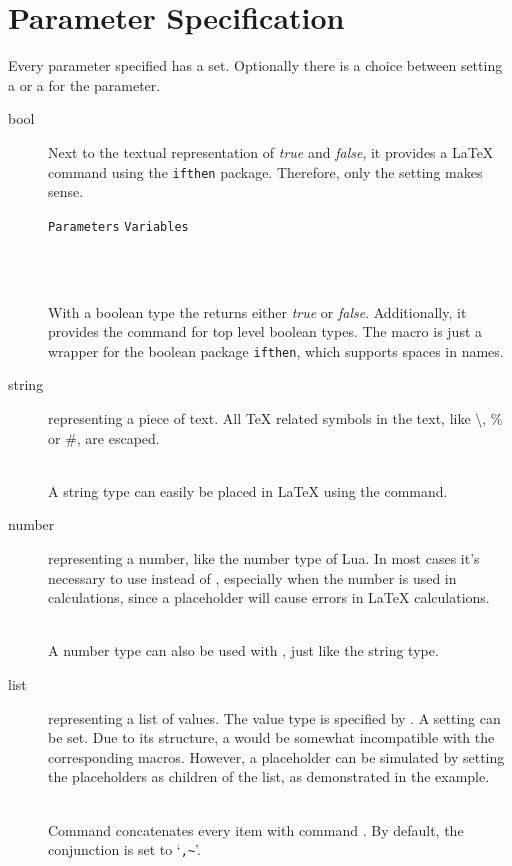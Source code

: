 \documentclass{ltxdoc}
\newcommand\showexample[5][15pt]{%
\begin{minipage}[t]{.5\linewidth - .5 \columnsep}%

\end{minipage}\hspace*{\columnsep}%
\begin{minipage}[t]{.5\linewidth - .5 \columnsep}%

\end{minipage}\\%
}
\begin{document}
    \clearpage
    \section{Parameter Specification}
    Every parameter specified has a  set.
    Optionally there is a choice between setting a  or a  for the parameter.
    \begin{description}
        \item[bool] Next to the textual representation of \textit{true} and \textit{false}, it provides a \LaTeX{} command using the \texttt{ifthen} package.
        Therefore, only the  setting makes sense.\\[5pt]
        \hspace*{5pt}\parbox{\linewidth-5pt}{%
            \hfill\texttt{Parameters}\hfill\hspace*{\columnsep}%
            \hfill\texttt{Variables}\hfill\hspace*{\columnsep}}\\%
        \showexample{1}{1-3}{1}{1-1}
        \DescribeMacro{\param}
        With a boolean type the \cmd{\param} returns either \textit{true} or \textit{false}.
        \DescribeMacro{\ifparam}
        Additionally, it provides the \cmd{\ifparam} command for top level boolean types.
        The macro is just a wrapper for the boolean package \texttt{ifthen}, which supports spaces in names.
        \item[string] representing a piece of text.
        All \TeX{} related symbols in the text, like \textbackslash, \% or \#, are escaped.\\
        \showexample{4}{4-6}{2}{2-2}
        \DescribeMacro{\param} A string type can easily be placed in \LaTeX{} using the \cmd{\param} command.
        \item[number] representing a number, like the number type of Lua.
        In most cases it's necessary to use  instead of , especially when the number is used in calculations, since a placeholder will cause errors in \LaTeX{} calculations.\\
        \showexample{7}{7-9}{3}{3-3}
        A number type can also be used with \cmd{\param}, just like the string type.
        \item[list] representing a list of values.
        The value type is specified by .
        A  setting can be set.
        Due to its structure, a  would be somewhat incompatible with the corresponding macros.
        However, a placeholder can be simulated by setting the placeholders as children of the  list, as demonstrated in the example.\\
        \showexample{10}{10-15}{4}{4-6}
        \DescribeMacro{\param}
        Command \cmd{\param} concatenates every item with command \cmd{\paramlistconjunction}.
        \DescribeMacro{\paramlistconjunction}
        By default, the conjunction is set to `\texttt{,\textasciitilde}'.


\end{description}
\end{document}
